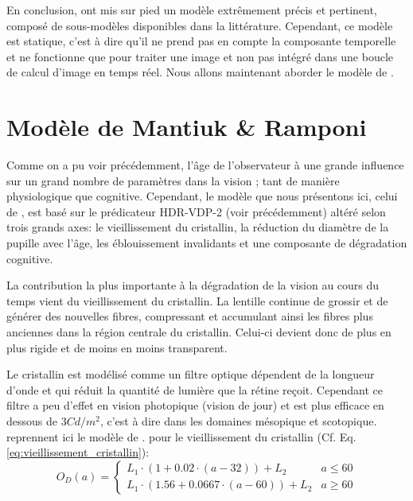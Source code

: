 	\par En conclusion, \citep{pattanaik_multiscale_1998} ont mis sur pied un modèle extrêmement précis et pertinent, composé de sous-modèles disponibles dans la littérature. Cependant, ce modèle est statique, c'est à dire qu'il ne prend pas en compte la composante temporelle et ne fonctionne que pour traiter une image et non pas intégré dans une boucle de calcul d'image en temps réel. Nous allons maintenant aborder le modèle de \citep{mantiuk_human_2015}.
	
	\chapter{Modèle de Mantiuk \& Ramponi}
	\label{sec:modele_mantiuk}
	\par Comme on a pu voir précédemment, l'âge de l'observateur à une grande influence sur un grand nombre de paramètres dans la vision ; tant de manière physiologique que cognitive. Cependant, le modèle que nous présentons ici, celui de \citep{mantiuk_human_2015}, est basé sur le prédicateur HDR-VDP-2 (voir précédemment) altéré selon trois grands axes: le vieillissement du cristallin, la réduction du diamètre de la pupille avec l'âge, les éblouissement invalidants et une composante de dégradation cognitive. 
	
	\par La contribution la plus importante à la dégradation de la vision au cours du temps vient du vieillissement du cristallin. La lentille continue de grossir et de générer des nouvelles fibres, compressant et accumulant ainsi les fibres plus anciennes dans la région centrale du cristallin. Celui-ci devient donc de plus en plus rigide et de moins en moins transparent.
	
	\par Le cristallin est modélisé comme un filtre optique dépendent de la longueur d'onde et qui réduit la quantité de lumière que la rétine reçoit. Cependant ce filtre a peu d'effet en vision photopique (vision de jour) et est plus efficace en dessous de $3 Cd/m^2$, c'est à dire dans les domaines mésopique et scotopique.
	\citep{mantiuk_human_2015} reprennent ici le modèle de \citep{pokorny_aging_1987}. pour le vieillissement du cristallin (Cf. Eq. \ref{eq:vieillissement_cristallin}):
	\begin{equation}
		O_D(a) = \begin{cases}
			 L_1 \cdot (1+0.02 \cdot (a-32))+L_2 & a \leq 60 \\ L_1 \cdot (1.56+0.0667 \cdot (a-60))+L_2 & a \geq 60 \end{cases}
		\label{eq:vieillissement_cristallin}
	\end{equation}
	
